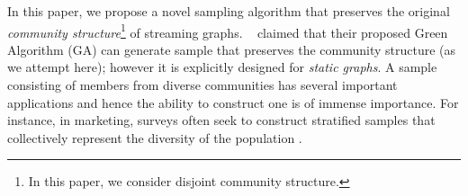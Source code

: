 In this paper, we propose a novel sampling algorithm that preserves the original {\em community structure}\footnote{In this paper, we consider disjoint community structure.} of streaming graphs. 
~\cite{tong2016novel} claimed that their proposed Green Algorithm (GA) can generate sample that preserves the community structure (as we attempt here); however it is explicitly designed for {\em static graphs}. 
A sample consisting of members from diverse communities has several important applications and hence the ability to construct one is of immense importance. For instance, in marketing, surveys often seek to construct stratified
samples that collectively represent the diversity of the population \cite{Kolaczyk:2009}. 

